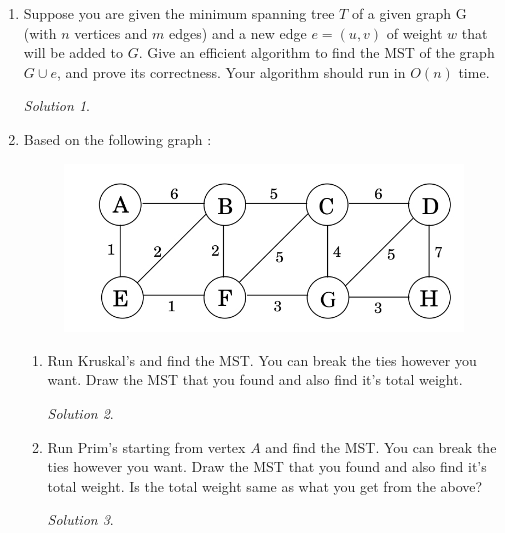\documentclass[12pt]{article}
\theoremstyle{remark}
\newtheorem*{solution}{Solution}
\begin{document}
\begin{enumerate}

\item Suppose you are given the minimum spanning tree $T$ of a given graph G (with $n$ vertices and $m$ edges) and a new edge $e=(u,v)$ of weight $w$ that will be added to $G$. Give an efficient algorithm to find the MST of the graph $G\cup e$, and prove its correctness. Your algorithm should run in $O(n)$ time.\\
\begin{solution}

\end{solution}

\item Based on the following graph :
\begin{figure}[h!]
\begin{center}
\includegraphics[scale=0.3]{mst_graph_q2.jpg} 
\end{center}
\end{figure}

\begin{enumerate}[label=(\alph*)]

\item Run Kruskal's and find the MST. You can break the ties however you want. Draw the MST that you found and also find it's total weight.
\begin{solution}

\end{solution}
\pagebreak
\item Run Prim's starting from vertex $A$ and find the MST. You can break the ties however you want. Draw the MST that you found and also find it's total weight. Is the total weight same as what you get from the above?
\begin{solution}

\end{solution}
 
\end{enumerate}


\end{enumerate}
\end{document}
